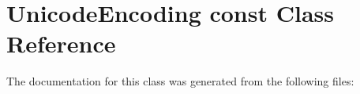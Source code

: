 \hypertarget{classUnicodeEncoding_01const}{}\section{Unicode\+Encoding const Class Reference}
\label{classUnicodeEncoding_01const}


The documentation for this class was generated from the following files\+: